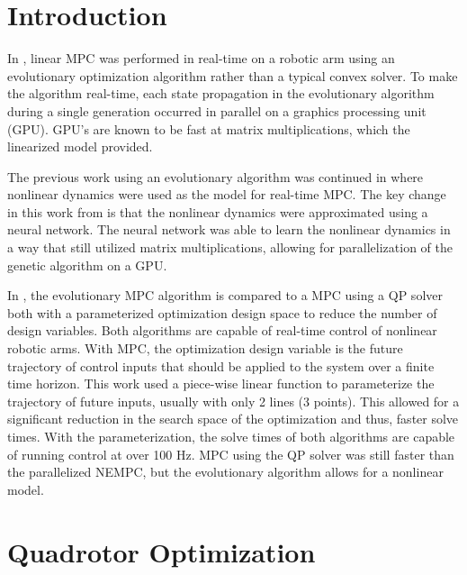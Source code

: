 \documentclass[letterpaper, 10 pt, conference]{ieeeconf}  %
\begin{document}


\section{Introduction}

In \cite{hyatt2017real}, linear MPC was performed in real-time on a robotic arm using an evolutionary optimization algorithm rather than a typical convex solver. To make the algorithm real-time, each state propagation in the evolutionary algorithm during a single generation occurred in parallel on a graphics processing unit (GPU). GPU's are known to be fast at matrix multiplications, which the linearized model provided.

The previous work using an evolutionary algorithm was continued in \cite{hyatt2019real} where nonlinear dynamics were used as the model for real-time MPC. The key change in this work from \cite{hyatt2017real} is that the nonlinear dynamics were approximated using a neural network. The neural network was able to learn the nonlinear dynamics in a way that still utilized matrix multiplications, allowing for parallelization of the genetic algorithm on a GPU.

In \cite{hyatt2020parameterized}, the evolutionary MPC algorithm is compared to a MPC using a QP solver both with a parameterized optimization design space to reduce the number of design variables. Both algorithms are capable of real-time control of nonlinear robotic arms. With MPC, the optimization design variable is the future trajectory of control inputs that should be applied to the system over a finite time horizon. This work used a piece-wise linear function to parameterize the trajectory of future inputs, usually with only 2 lines (3 points). This allowed for a significant reduction in the search space of the optimization and thus, faster solve times. With the parameterization, the solve times of both algorithms are capable of running control at over 100 Hz. MPC using the QP solver was still faster than the parallelized NEMPC, but the evolutionary algorithm allows for a nonlinear model.


\section{Quadrotor Optimization}
\end{document}
